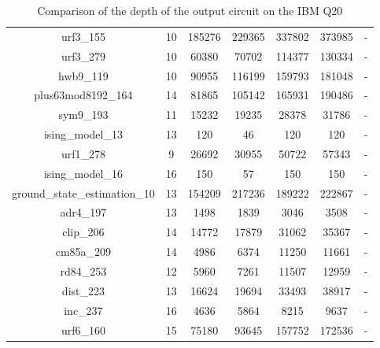 \documentclass[runningheads]{llncs}
\begin{document}
\begin{table}[H]
\begin{center}
\begin{tabular}{|c|c|c|c|c|c|c|}
									urf3\_155 & 10 & 185276 & 229365 & 337802 & 373985 & - \\
									urf3\_279 & 10 & 60380 & 70702 & 114377 & 130334 & - \\
									hwb9\_119 & 10 & 90955 & 116199 & 159793 & 181048 & - \\
									plus63mod8192\_164 & 14 & 81865 & 105142 & 165931 & 190486 & - \\
									sym9\_193 & 11 & 15232 & 19235 & 28378 & 31786 & - \\
									ising\_model\_13 & 13 & 120 & 46 & 120 & 120 & - \\
									urf1\_278 & 9 & 26692 & 30955 & 50722 & 57343 & - \\
									ising\_model\_16 & 16 & 150 & 57 & 150 & 150 & - \\
									ground\_state\_estimation\_10 & 13 & 154209 & 217236 & 189222 & 222867 & - \\
									adr4\_197 & 13 & 1498 & 1839 & 3046 & 3508 & - \\
									clip\_206 & 14 & 14772 & 17879 & 31062 & 35367 & - \\
									cm85a\_209 & 14 & 4986 & 6374 & 11250 & 11661 & - \\
									rd84\_253 & 12 & 5960 & 7261 & 11507 & 12959 & - \\
									dist\_223 & 13 & 16624 & 19694 & 33493 & 38917 & - \\
									inc\_237 & 16 & 4636 & 5864 & 8215 & 9637 & - \\
									urf6\_160 & 15 & 75180 & 93645 & 157752 & 172536 & - \\
								\hline
									\end{tabular} 
									\end{center}						
									\caption{Comparison of  the depth of the output circuit on the IBM Q20}  
									\label{tab9}
								\end{table}


									
\end{document}

